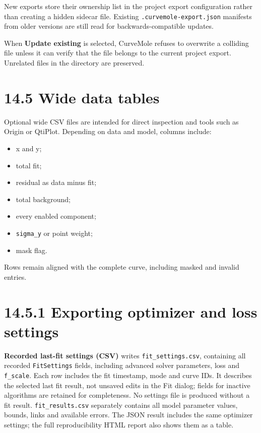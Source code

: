 \documentclass[
  10pt,
  a4paper,
  oneside]{scrreprt}
\providecommand{\tightlist}{%
  \setlength{\itemsep}{0pt}\setlength{\parskip}{0pt}}
\begin{document}
New exports store their ownership list in the project export
configuration rather than creating a hidden sidecar file. Existing
\texttt{.curvemole-export.json} manifests from older versions are still
read for backwards-compatible updates.

When \textbf{Update existing} is selected, CurveMole refuses to
overwrite a colliding file unless it can verify that the file belongs to
the current project export. Unrelated files in the directory are
preserved.

\hypertarget{wide-data-tables}{%
\section{14.5 Wide data tables}\label{wide-data-tables}}

Optional wide CSV files are intended for direct inspection and tools
such as Origin or QtiPlot. Depending on data and model, columns include:

\begin{itemize}
\tightlist
\item
  x and y;
\item
  total fit;
\item
  residual as data minus fit;
\item
  total background;
\item
  every enabled component;
\item
  \texttt{sigma\_y} or point weight;
\item
  mask flag.
\end{itemize}

Rows remain aligned with the complete curve, including masked and
invalid entries.

\hypertarget{exporting-optimizer-and-loss-settings}{%
\section{14.5.1 Exporting optimizer and loss
settings}\label{exporting-optimizer-and-loss-settings}}

\textbf{Recorded last-fit settings (CSV)} writes
\texttt{fit\_settings.csv}, containing all recorded \texttt{FitSettings}
fields, including advanced solver parameters, loss and
\texttt{f\_scale}. Each row includes the fit timestamp, mode and curve
IDs. It describes the selected last fit result, not unsaved edits in the
Fit dialog; fields for inactive algorithms are retained for
completeness. No settings file is produced without a fit result.
\texttt{fit\_results.csv} separately contains all model parameter
values, bounds, links and available errors. The JSON result includes the
same optimizer settings; the full reproducibility HTML report also shows
them as a table.
\end{document}
